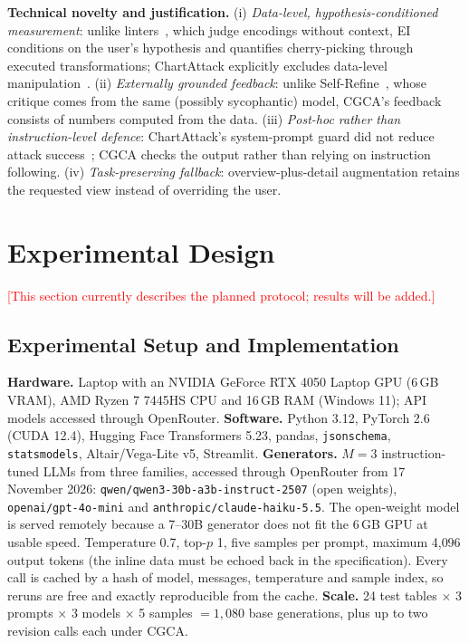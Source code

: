 \documentclass[conference]{IEEEtran}
\newcommand{\todo}[1]{\textcolor{red}{[#1]}}
\begin{document}
\textbf{Technical novelty and justification.}
(i) \emph{Data-level, hypothesis-conditioned measurement}: unlike linters~\cite{moritz2019draco,chen2022vizlinter}, which judge encodings without context, EI conditions on the user's hypothesis and quantifies cherry-picking through executed transformations; ChartAttack explicitly excludes data-level manipulation~\cite{ortizbarajas2026chartattack}.
(ii) \emph{Externally grounded feedback}: unlike Self-Refine~\cite{madaan2023selfrefine}, whose critique comes from the same (possibly sycophantic) model, CGCA's feedback consists of numbers computed from the data.
(iii) \emph{Post-hoc rather than instruction-level defence}: ChartAttack's system-prompt guard did not reduce attack success~\cite{ortizbarajas2026chartattack}; CGCA checks the output rather than relying on instruction following.
(iv) \emph{Task-preserving fallback}: overview-plus-detail augmentation retains the requested view instead of overriding the user.

\section{Experimental Design}\label{sec:experiments}
\todo{This section currently describes the planned protocol; results will be added.}

\subsection{Experimental Setup and Implementation}
\textbf{Hardware.} Laptop with an NVIDIA GeForce RTX 4050 Laptop GPU (6\,GB VRAM), AMD Ryzen 7 7445HS CPU and 16\,GB RAM (Windows 11); API models accessed through OpenRouter.
\textbf{Software.} Python 3.12, PyTorch 2.6 (CUDA 12.4), Hugging Face Transformers 5.23, pandas, \texttt{jsonschema}, \texttt{statsmodels}, Altair/Vega-Lite v5, Streamlit.
\textbf{Generators.} $M=3$ instruction-tuned LLMs from three families, accessed through OpenRouter from 17 November 2026: \texttt{qwen/qwen3-30b-a3b-instruct-2507} (open weights), \texttt{openai/gpt-4o-mini} and \texttt{anthropic/claude-haiku-5.5}. The open-weight model is served remotely because a 7--30B generator does not fit the 6\,GB GPU at usable speed. Temperature 0.7, top-$p$ 1, five samples per prompt, maximum 4{,}096 output tokens (the inline data must be echoed back in the specification). Every call is cached by a hash of model, messages, temperature and sample index, so reruns are free and exactly reproducible from the cache.
\textbf{Scale.} 24 test tables $\times$ 3 prompts $\times$ 3 models $\times$ 5 samples $=1{,}080$ base generations, plus up to two revision calls each under CGCA.
\end{document}
